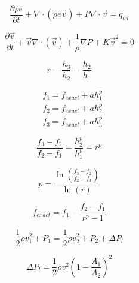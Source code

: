 \documentclass[11pt,epsfig]{article}
\begin{document}
{\begin{equation*}
\frac{\partial \rho e}{\partial t}+\nabla\cdot(\rho e\vec{v})+P\nabla\cdot\vec{v}=q_{wl}
\end{equation*}

\begin{equation*}
\frac{\partial \vec{v}}{\partial t}+\vec{v}\nabla\cdot(\vec{v})+\frac{1}{\rho}\nabla P + K\vec{v}^2=0
\end{equation*}

\begin{equation*}
         r = \frac{ h_3 }{ h_2 } = \frac{ h_2 }{ h_1 } 
\end{equation*}

\begin{align*}
   &f_1 = f_{exact} + a h^p_1\\
   &f_2 = f_{exact} + a h^p_2\\
   &f_3 = f_{exact} + a h^p_3
\end{align*}

\begin{equation*}
   \frac{ f_3 - f_2 }{ f_2 - f_1 } = \frac{ h^p_2 }{ h^p_1 } = r^p
\end{equation*}

\begin{equation*}
   p = \frac{ \ln \left( \frac{ f_3 - f_2 }{ f_2 - f_1 } \right) }{ \ln \left( r \right) }
\end{equation*}

\begin{equation*}
   f_{exact} = f_1 - \frac{ f_2 - f_1 }{ r^p - 1 }
\end{equation*}

\begin{equation*}
\frac{1}{2} \rho v^2_1 + P_1 = \frac{1}{2} \rho v^2_2 + P_2 + \Delta P_l
\end{equation*}

\begin{equation*}
\Delta P_l = 
\frac{1}{2} \rho v^2_1 
\left(
1
-\frac{A_1}{A_2}
\right)^2
\end{equation*} 


}

\showpoints
\end{document}
